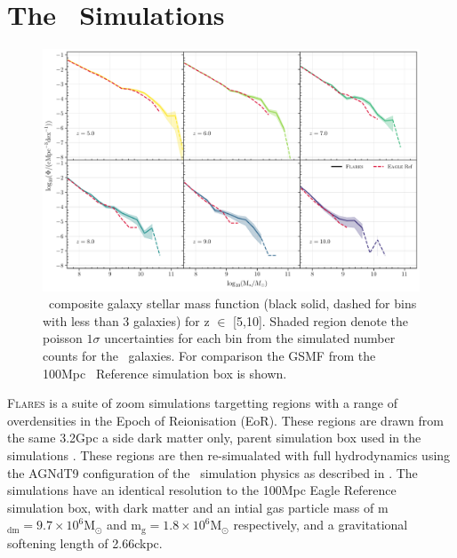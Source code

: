 \section{The \flare\, Simulations}\label{sec:simulations}
\begin{figure}
	\centering
	\includegraphics[width=\textwidth]{./figures/GSMF_z5_10}
	\caption{\flares\, composite galaxy stellar mass function (black solid, dashed for bins with less than 3 galaxies) for z $\in$ [5,10]. Shaded region denote the poisson $1\sigma$ uncertainties for	each bin from the simulated number counts for the \flares\, galaxies. For comparison the GSMF from the 100Mpc \eagle\, Reference simulation box is shown. \label{fig: GSMF}} 
\end{figure}

\textsc{Flares} is a suite of zoom simulations targetting regions with a range of overdensities in the Epoch of Reionisation (EoR). 
These regions are drawn from the same 3.2Gpc a side dark matter only, parent simulation box used in the \ceagle\, simulations \cite{barnes_redshift_2017}. These regions are then re-simualated with full hydrodynamics using the AGNdT9 configuration of the \eagle\, simulation physics as described in \cite{schaye_eagle_2015,crain_eagle_2015}. The simulations have an identical resolution to the 100Mpc Eagle Reference simulation box, with dark matter and an intial gas particle mass of m$_{\text{dm}}=9.7\times10^6$M$_{\odot}$ and m$_{\textrm{g}}=1.8\times10^6$M$_{\odot}$ respectively, and a gravitational softening length of 2.66ckpc. 

